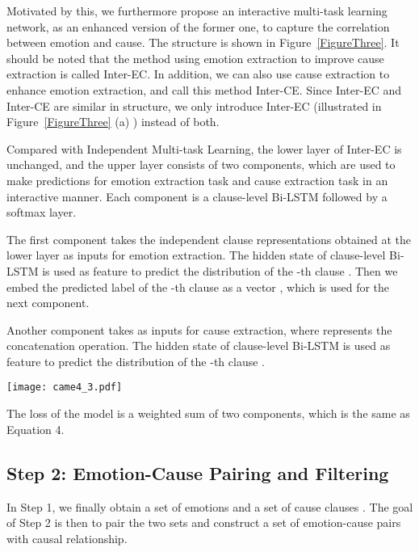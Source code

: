 \documentclass[11pt,a4paper]{article}
\begin{document}
Motivated by this, we furthermore propose an interactive multi-task learning network, as an enhanced version of the former one, to capture the correlation between emotion and cause. The structure is shown in Figure~\ref{FigureThree}. It should be noted that the method using emotion extraction to improve cause extraction is called Inter-EC. In addition, we can also use cause extraction to enhance emotion extraction, and call this method Inter-CE. Since Inter-EC and Inter-CE are similar in structure, we only introduce Inter-EC (illustrated in Figure~\ref{FigureThree} (a) ) instead of both.

Compared with Independent Multi-task Learning, the lower layer of Inter-EC is unchanged, and the upper layer consists of two components, which are used to make predictions for emotion extraction task and cause extraction task in an interactive manner. Each component is a clause-level Bi-LSTM followed by a softmax layer.

The first component takes the independent clause representations   obtained at the lower layer as inputs for emotion extraction. The hidden state of clause-level Bi-LSTM   is used as feature to predict the distribution of the -th clause  . Then we embed the predicted label of the -th clause as a vector  , which is used for the next component.

Another component takes  as inputs for cause extraction, where  represents the concatenation operation. The hidden state of clause-level Bi-LSTM  is used as feature to predict the distribution of the -th clause  .

\begin{figure*}
	\centering
	\texttt{[image: came4\_3.pdf]}
	\caption{Two Models for Interactive Multi-task Learning: (a) Inter-EC, which uses emotion extraction to improve cause extraction (b) Inter-CE, which uses cause extraction to enhance emotion extraction.}
	\label{FigureThree}
\end{figure*}

The loss of the model is a weighted sum of two components, which is the same as Equation 4.



\subsection{Step 2: Emotion-Cause Pairing and Filtering}
In Step 1, we finally obtain a set of emotions  and a set of cause clauses  . The goal of Step 2 is then to pair the two sets and construct a set of emotion-cause pairs with causal relationship.
\end{document}
